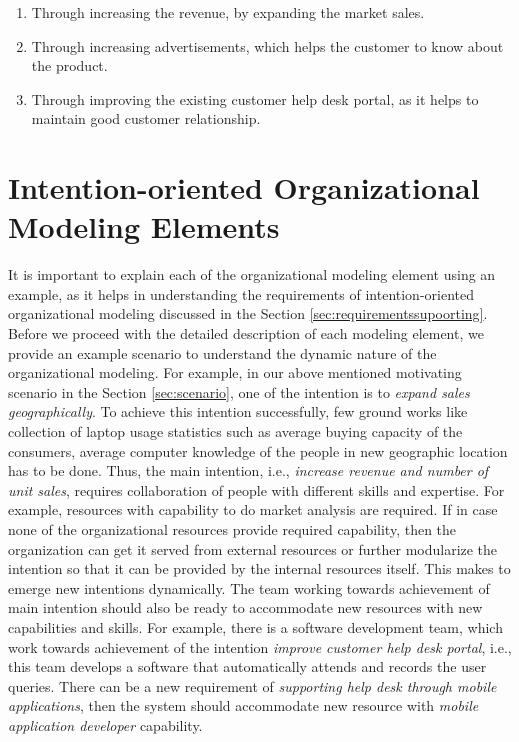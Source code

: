  \begin{enumerate}
 	\item Through increasing the revenue, by expanding the market sales. 
 	\item Through increasing advertisements, which helps the customer to know about the product.
 	\item Through improving the existing customer help desk portal, as it helps to maintain good customer relationship.
 \end{enumerate}
 
\section{Intention-oriented Organizational Modeling Elements}
\label{sec:entities}
It is important to explain each of the organizational modeling element using an example, as it helps in understanding the requirements of intention-oriented organizational modeling discussed in the Section \ref{sec:requirementssupoorting}. Before we proceed with the detailed description of each modeling element, we provide an example scenario to understand the dynamic nature of the organizational modeling. For example, in our above mentioned motivating scenario in the Section \ref{sec:scenario}, one of the intention is to \textit{expand sales geographically}. To achieve this intention successfully, few ground works like collection of laptop usage statistics such as average buying capacity of the consumers, average computer knowledge of the people in new geographic location has to be done. Thus, the main intention, i.e., \textit{increase revenue and number of unit sales}, requires collaboration of people with different skills and expertise. For example, resources with capability to do market analysis are required. If in case none of the organizational resources provide required capability, then the organization can get it served from external resources or further modularize the intention so that it can be provided by the internal resources itself. This makes to emerge new intentions dynamically. The team working towards achievement of main intention should also be ready to accommodate new resources with new capabilities and skills. For example, there is a software development team, which work towards achievement of the intention \textit{improve customer help desk portal}, i.e., this team develops a software that automatically attends and records the user queries. There can be a new requirement of \textit{supporting help desk through mobile applications}, then the system should accommodate new resource with \textit{mobile application developer} capability. 

